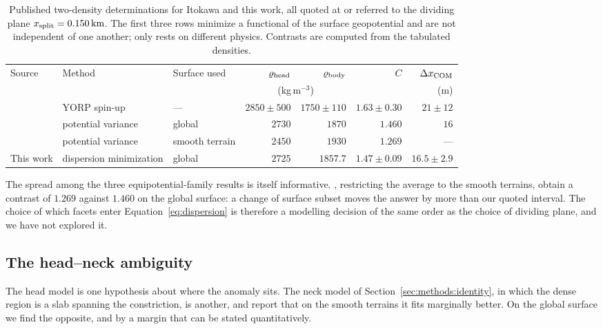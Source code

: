 \begin{table}[htbp]
\centering
\footnotesize
\setlength{\tabcolsep}{2pt}
\caption{Published two-density determinations for Itokawa and this work,
all quoted at or referred to the dividing plane
$x_{\mathrm{split}} = \SI{0.150}{\kilo\metre}$. The first three rows minimize a
functional of the surface geopotential and are not independent of one
another; only \citet{lowry2014} rests on different physics. Contrasts are
computed from the tabulated densities.}
\label{tab:itokawacompare}
\begin{tabular}{lllrrrr}
\toprule
Source & Method & Surface used & $\varrho_{\mathrm{head}}$ & $\varrho_{\mathrm{body}}$ & $C$ & $\Delta x_{\mathrm{COM}}$ \\
       &        &              & \multicolumn{2}{c}{(kg\,m$^{-3}$)} & & (m) \\
\midrule
\citet{lowry2014}       & YORP spin-up            & ---            & $2850\pm500$ & $1750\pm110$ & $1.63\pm0.30$ & $21\pm12$ \\
\citet{kanamaru2019}    & potential variance      & global         & $2730$       & $1870$       & $1.460$       & $16$ \\
\citet{kanamaru2019pss} & potential variance      & smooth terrain & $2450$       & $1930$       & $1.269$       & --- \\
This work               & dispersion minimization & global         & $2725$       & $1857.7$     & $1.47\pm0.09$ & $16.5\pm2.9$ \\
\bottomrule
\end{tabular}
\end{table}

The spread among the three equipotential-family results is itself
informative. \citet{kanamaru2019pss}, restricting the average to the
smooth terrains, obtain a contrast of $1.269$ against $1.460$ on the
global surface: a change of surface subset moves the answer by more than
our quoted interval. The choice of which facets enter
Equation~\eqref{eq:dispersion} is therefore a modelling decision of the
same order as the choice of dividing plane, and we have not explored it.

\subsection{The head--neck ambiguity}
\label{sec:itokawa:ambiguity}

The head model is one hypothesis about where the anomaly sits. The neck
model of Section~\ref{sec:methods:identity}, in which the dense region is
a slab spanning the constriction, is another, and
\citet{kanamaru2019pss} report that on the smooth terrains it fits
marginally better. On the global surface we find the opposite, and by a
margin that can be stated quantitatively.

